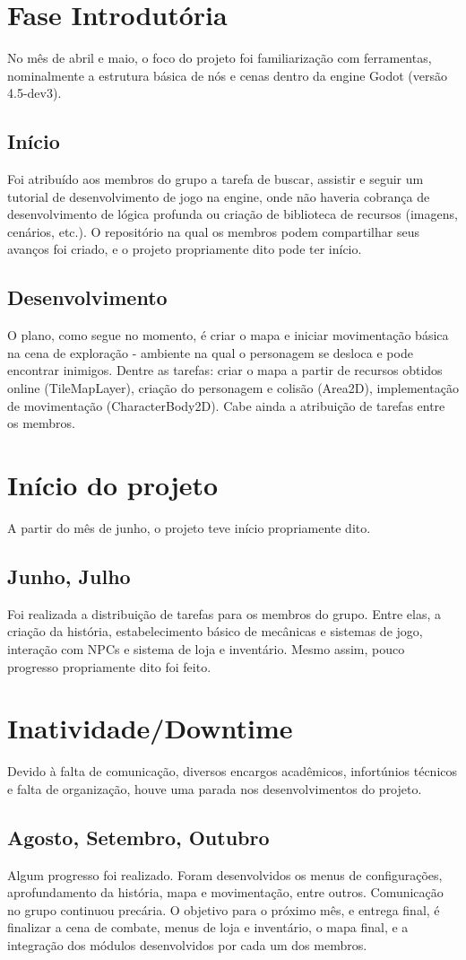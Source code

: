 

%
\section{Fase Introdutória}
    No mês de abril e maio, o foco do projeto foi familiarização com ferramentas, nominalmente a estrutura básica de nós e cenas dentro da engine Godot (versão 4.5-dev3).
\subsection{Início}
    Foi atribuído aos membros do grupo a tarefa de buscar, assistir e seguir um tutorial de desenvolvimento de jogo na engine, onde não haveria cobrança de desenvolvimento de lógica profunda ou criação de biblioteca de recursos (imagens, cenários, etc.). 
    O repositório na qual os membros podem compartilhar seus avanços foi criado, e o projeto propriamente dito pode ter início. 
\subsection{Desenvolvimento}
    O plano, como segue no momento, é criar o mapa e iniciar movimentação básica na cena de exploração - ambiente na qual o personagem se desloca e pode encontrar inimigos. Dentre as tarefas: criar o mapa a partir de recursos obtidos online (TileMapLayer), criação do personagem e colisão (Area2D), implementação de movimentação (CharacterBody2D). Cabe ainda a atribuição de tarefas entre os membros. 

\section{Início do projeto}
    A partir do mês de junho, o projeto teve início propriamente dito. 
\subsection{Junho, Julho}
    Foi realizada a distribuição de tarefas para os membros do grupo. Entre elas, a criação da história, estabelecimento básico de mecânicas e sistemas de jogo, interação com NPCs e sistema de loja e inventário. Mesmo assim, pouco progresso propriamente dito foi feito.

\section{Inatividade/Downtime}
    Devido à falta de comunicação, diversos encargos acadêmicos, infortúnios técnicos e falta de organização, houve uma parada nos desenvolvimentos do projeto.
\subsection{Agosto, Setembro, Outubro}
    Algum progresso foi realizado. Foram desenvolvidos os menus de configurações, aprofundamento da história, mapa e movimentação, entre outros. Comunicação no grupo continuou precária. O objetivo para o próximo mês, e entrega final, é finalizar a cena de combate, menus de loja e inventário, o mapa final, e a integração dos módulos desenvolvidos por cada um dos membros.